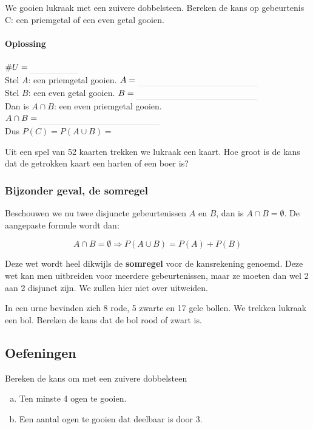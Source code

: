\documentclass[12pt,twoside]{article}
\begin{document}
\begin{oefening}
We gooien lukraak met een zuivere dobbelsteen. Bereken de kans op gebeurtenis C:
een priemgetal of een even getal gooien.
\paragraph*{Oplossing} $\#U=\arule{2cm}$\\
Stel $A$: een priemgetal gooien. $A=\arule{5cm}$\\
Stel $B$: een even getal gooien. $B=\arule{5cm}$\\
Dan is $A\cap B$: een even priemgetal gooien. $A\cap B=\arule{5cm}$\\
Dus $P(C)=P(A\cup B)=$
\end{oefening}

\begin{oefening}
Uit een spel van 52 kaarten trekken we lukraak een kaart. Hoe groot is de kans dat de
getrokken kaart een harten of een boer is?
\end{oefening}

\subsubsection{Bijzonder geval, de somregel}
Beschouwen we nu twee disjuncte gebeurtenissen $A$ en $B$, dan is $A \cap B = \emptyset$.
De aangepaste formule wordt dan:\\
\begin{mdframed}
$$A \cap B = \emptyset \Rightarrow P(A\cup B)=P(A)+P(B)$$
\end{mdframed}
Deze wet wordt heel dikwijls de {\bf somregel} voor de kansrekening genoemd. Deze wet
kan men uitbreiden voor meerdere gebeurtenissen, maar ze moeten dan wel 2 aan 2
disjunct zijn. We zullen hier niet over uitweiden.

\begin{oefening}
In een urne bevinden zich 8 rode, 5 zwarte en 17 gele bollen. We trekken lukraak een
bol. Bereken de kans dat de bol rood of zwart is.
\end{oefening}

\subsection{Oefeningen}

\begin{oefening}
Bereken de kans om met een zuivere dobbelsteen
\begin{enumerate}[(a)]
  \item Ten minste 4 ogen te gooien.
  \item Een aantal ogen te gooien dat deelbaar is door 3.
\end{enumerate}
\end{oefening}
\end{document}
